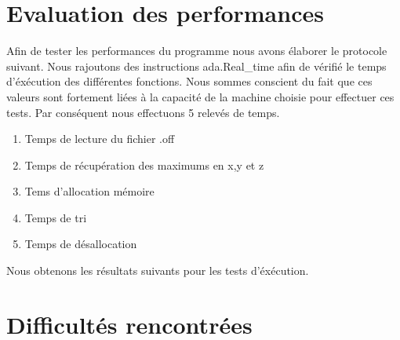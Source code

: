 \documentclass[a4paper]{article}
\begin{document}
\section{Evaluation des performances}
Afin de tester les performances du programme nous avons élaborer le protocole suivant. Nous rajoutons des instructions ada.Real\_time afin de vérifié le temps d'éxécution des différentes fonctions. Nous sommes conscient du fait que ces valeurs sont fortement liées à la capacité de la machine choisie pour effectuer ces tests. Par conséquent nous effectuons 5 relevés de temps.
\begin{enumerate}
\item Temps de lecture du fichier .off
\item Temps de récupération des maximums en x,y et z
\item Tems d'allocation mémoire
\item Temps de tri
\item Temps de désallocation
\end{enumerate}
Nous obtenons les résultats suivants pour les tests d'éxécution.



\section{Difficultés rencontrées}

\end{document}
